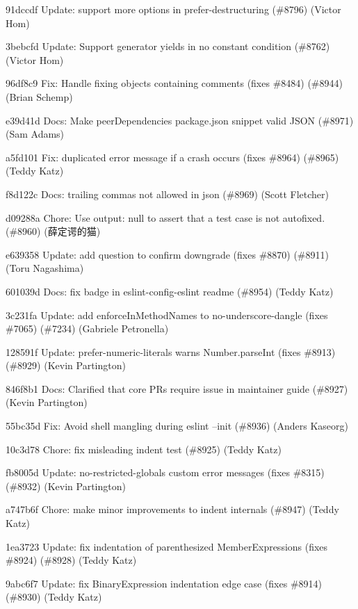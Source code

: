 \begin{DoxyItemize}
\item 91dccdf Update\+: support more options in prefer-\/destructuring (\#8796) (Victor Hom)
\item 3bebcfd Update\+: Support generator yields in no constant condition (\#8762) (Victor Hom)
\item 96df8c9 Fix\+: Handle fixing objects containing comments (fixes \#8484) (\#8944) (Brian Schemp)
\item e39d41d Docs\+: Make {\ttfamily peer\+Dependencies} package.\+json snippet valid J\+S\+ON (\#8971) (Sam Adams)
\item a5fd101 Fix\+: duplicated error message if a crash occurs (fixes \#8964) (\#8965) (Teddy Katz)
\item f8d122c Docs\+: trailing commas not allowed in json (\#8969) (Scott Fletcher)
\item d09288a Chore\+: Use {\ttfamily output\+: null} to assert that a test case is not autofixed. (\#8960) (薛定谔的猫)
\item e639358 Update\+: add question to confirm downgrade (fixes \#8870) (\#8911) (Toru Nagashima)
\item 601039d Docs\+: fix badge in eslint-\/config-\/eslint readme (\#8954) (Teddy Katz)
\item 3c231fa Update\+: add enforce\+In\+Method\+Names to no-\/underscore-\/dangle (fixes \#7065) (\#7234) (Gabriele Petronella)
\item 128591f Update\+: prefer-\/numeric-\/literals warns Number.\+parse\+Int (fixes \#8913) (\#8929) (Kevin Partington)
\item 846f8b1 Docs\+: Clarified that core P\+Rs require issue in maintainer guide (\#8927) (Kevin Partington)
\item 55bc35d Fix\+: Avoid shell mangling during eslint --init (\#8936) (Anders Kaseorg)
\item 10c3d78 Chore\+: fix misleading {\ttfamily indent} test (\#8925) (Teddy Katz)
\item fb8005d Update\+: no-\/restricted-\/globals custom error messages (fixes \#8315) (\#8932) (Kevin Partington)
\item a747b6f Chore\+: make minor improvements to {\ttfamily indent} internals (\#8947) (Teddy Katz)
\item 1ea3723 Update\+: fix indentation of parenthesized Member\+Expressions (fixes \#8924) (\#8928) (Teddy Katz)
\item 9abc6f7 Update\+: fix Binary\+Expression indentation edge case (fixes \#8914) (\#8930) (Teddy Katz)

\end{DoxyItemize}
